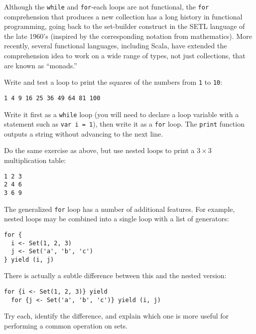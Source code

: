 \begin{tailquote}
Although the \verb|while| and \verb|for|-each loops are not functional, the \verb|for| comprehension that produces a new collection has a long history in functional programming, going back to the set-builder construct in the SETL language of the late 1960's (inspired by the corresponding notation from mathematics). More recently, several functional languages, including Scala, have extended the comprehension idea to work on a wide range of types, not just collections, that are known as ``monads.''
\end{tailquote}
\begin{exercises}
\problem Write and test a loop to print the squares of the numbers from \texttt{1} to \texttt{10}:
\begin{center}
\texttt{1 4 9 16 25 36 49 64 81 100}
\end{center}
Write it first as a \texttt{while} loop (you will need to declare a loop variable with a statement such as \verb|var i = 1|), then write it as a \texttt{for} loop. The \texttt{print} function outputs a string without advancing to the next line.

\problem Do the same exercise as above, but use nested loops to print a $3\times 3$ multiplication table:
\begin{center}
\texttt{1 2 3}\\
\texttt{2 4 6}\\
\texttt{3 6 9}
\end{center}

\problem The generalized \texttt{for} loop has a number of additional features. For example, nested loops may be combined into a single loop with a list of generators:
\begin{verbatim}
for {
  i <- Set(1, 2, 3)
  j <- Set('a', 'b', 'c')
} yield (i, j)
\end{verbatim}
There is actually a subtle difference between this and the nested version:
\begin{verbatim}
for {i <- Set(1, 2, 3)} yield
  for {j <- Set('a', 'b', 'c')} yield (i, j)
\end{verbatim}
Try each, identify the difference, and explain which one is more useful for performing a common operation on sets.
\end{exercises}

